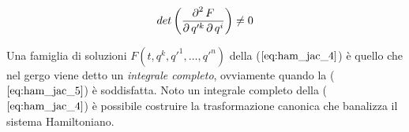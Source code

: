 \begin{equation} \label{eq:ham_jac_5}
det \left( \frac{\operatorname{\partial}^2 F}{\operatorname{\partial} q'^k \operatorname{\partial} q^i}\right) \neq 0
\end{equation}

Una famiglia di soluzioni $F(t,q^k,q'^1,\dots,q'^n)$ della ($ \ref{eq:ham_jac_4} $) è quello che nel gergo viene detto un \textit{integrale completo}, ovviamente quando la ($ \ref{eq:ham_jac_5} $) è soddisfatta. Noto un integrale completo della ($ \ref{eq:ham_jac_4} $) è possibile costruire la trasformazione  canonica che banalizza il sistema Hamiltoniano.